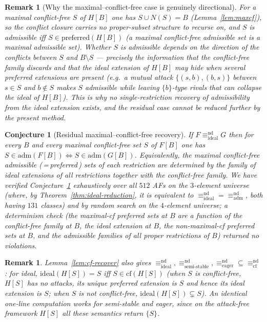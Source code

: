 \documentclass{amsart}
\newtheorem{remark}[theorem]{Remark}
\newtheorem{conjecture}[theorem]{Conjecture}
\theoremstyle{remark}
\begin{document}
\begin{remark}[Why the maximal--conflict-free case is genuinely directional]
\label{rem:directional}
For a maximal conflict-free $S$ of $H[B]$ one has $S\cup N(S)=B$
(Lemma~\ref{lem:maxcf}), so the conflict closure carries no proper-subset
structure to recurse on, and $S$ is admissible iff $S\in\mathrm{preferred}(H[B])$
(a maximal conflict-free admissible set is a maximal admissible set).  Whether
$S$ is admissible depends on the \emph{direction} of the conflicts between $S$
and $B\setminus S$ --- precisely the information that the conflict-free family
discards and that the ideal extension of $H[B]$ may hide when several preferred
extensions are present (e.g.\ a mutual attack $\{(s,b),(b,s)\}$ between $s\in S$
and $b\notin S$ makes $S$ admissible while leaving $\{b\}$-type rivals that can
collapse the ideal of $H[B]$).  This is why no single-restriction recovery of
admissibility from the ideal extension exists, and the residual case cannot be
reduced further by the present method.
\end{remark}

\begin{conjecture}[Residual maximal--conflict-free recovery]\label{conj:hard}
If $F\equiv^{\mathrm{nd}}_{\mathrm{ideal}}G$ then for every $B$ and every maximal
conflict-free set $S$ of $F[B]$ one has $S\in\mathrm{adm}(F[B])\iff
S\in\mathrm{adm}(G[B])$.  Equivalently, the maximal conflict-free admissible
(\,=\,preferred\,) sets of each restriction are determined by the family of ideal
extensions of all restrictions together with the conflict-free family.  We have
verified Conjecture~\ref{conj:hard} exhaustively over all $512$ AFs on the
$3$-element universe (where, by Theorem~\ref{thm:ideal-reduction}, it is
equivalent to $\equiv^{\mathrm{nd}}_{\mathrm{ideal}}=
\equiv^{\mathrm{nd}}_{\mathrm{adm}}$, both having $131$ classes) and by random
search on the $4$-element universe; a determinism check (the maximal-cf preferred
sets at $B$ are a function of the conflict-free family at $B$, the ideal
extension at $B$, the non-maximal-cf preferred sets at $B$, and the admissible
families of all proper restrictions of $B$) returned no violations.
\end{conjecture}

\begin{remark}\label{rem:cf-others}
Lemma~\ref{lem:cf-recover} also gives
$\equiv^{\mathrm{nd}}_{\mathrm{ideal}},
\equiv^{\mathrm{nd}}_{\mathrm{semi\text{-}stable}},
\equiv^{\mathrm{nd}}_{\mathrm{eager}}\subseteq
\equiv^{\mathrm{nd}}_{\mathrm{cf}}$: for ideal, $\mathrm{ideal}(H[S])=S$ iff
$S\in\mathrm{cf}(H[S])$ (when $S$ is conflict-free, $H[S]$ has no attacks, its
unique preferred extension is $S$ and hence its ideal extension is $S$; when $S$
is not conflict-free, $\mathrm{ideal}(H[S])\subsetneq S$).  An identical one-line
computation works for semi-stable and eager, since on the attack-free framework
$H[S]$ all these semantics return $\{S\}$.
\end{remark}
\end{document}
